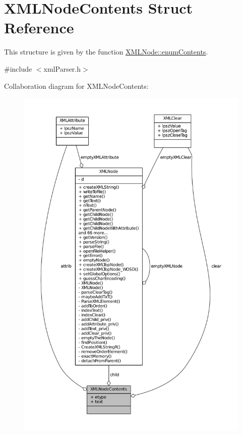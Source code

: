 \hypertarget{structXMLNodeContents}{\section{X\-M\-L\-Node\-Contents Struct Reference}
\label{structXMLNodeContents}
}


This structure is given by the function \hyperlink{group__navigate_gaf56414ef38a13892afc4f22177a7760a}{X\-M\-L\-Node\-::enum\-Contents}.  




{\ttfamily \#include $<$xml\-Parser.\-h$>$}



Collaboration diagram for X\-M\-L\-Node\-Contents\-:
\nopagebreak
\begin{figure}[H]
\begin{center}
\leavevmode
\includegraphics[width=350pt]{structXMLNodeContents__coll__graph}
\end{center}
\end{figure}

